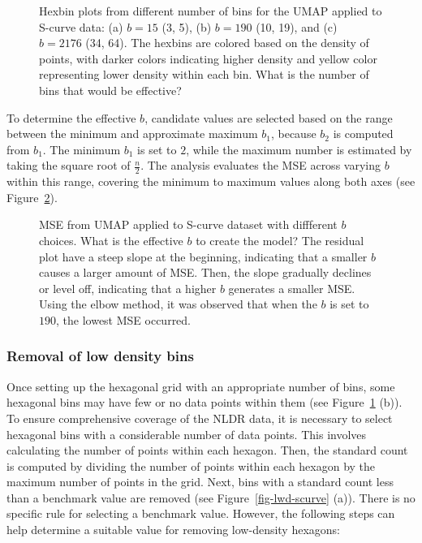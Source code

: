 \documentclass[
  12pt]{article}
\begin{document}
\begin{figure}[H]


\caption{\label{fig-bins-scurve}Hexbin plots from different number of
bins for the UMAP applied to S-curve data: (a) \(b = 15\) (3, 5), (b)
\(b = 190\) (10, 19), and (c) \(b = 2176\) (34, 64). The hexbins are
colored based on the density of points, with darker colors indicating
higher density and yellow color representing lower density within each
bin. What is the number of bins that would be effective?}

\end{figure}%

To determine the effective \(b\), candidate values are selected based on
the range between the minimum and approximate maximum \(b_1\), because
\(b_2\) is computed from \(b_1\). The minimum \(b_1\) is set to \(2\),
while the maximum number is estimated by taking the square root of
\(\frac{n}{2}\). The analysis evaluates the MSE across varying \(b\)
within this range, covering the minimum to maximum values along both
axes (see Figure~\ref{fig-mse-scurve-b}).

\begin{figure}[H]


\caption{\label{fig-mse-scurve-b}MSE from UMAP applied to S-curve
dataset with diffferent \(b\) choices. What is the effective \(b\) to
create the model? The residual plot have a steep slope at the beginning,
indicating that a smaller \(b\) causes a larger amount of MSE. Then, the
slope gradually declines or level off, indicating that a higher \(b\)
generates a smaller MSE. Using the elbow method, it was observed that
when the \(b\) is set to \(190\), the lowest MSE occurred.}

\end{figure}%

\subsubsection{Removal of low density
bins}\label{removal-of-low-density-bins}

Once setting up the hexagonal grid with an appropriate number of bins,
some hexagonal bins may have few or no data points within them (see
Figure~\ref{fig-bins-scurve} (b)). To ensure comprehensive coverage of
the NLDR data, it is necessary to select hexagonal bins with a
considerable number of data points. This involves calculating the number
of points within each hexagon. Then, the standard count is computed by
dividing the number of points within each hexagon by the maximum number
of points in the grid. Next, bins with a standard count less than a
benchmark value are removed (see Figure~\ref{fig-lwd-scurve} (a)). There
is no specific rule for selecting a benchmark value. However, the
following steps can help determine a suitable value for removing
low-density hexagons:
\end{document}
